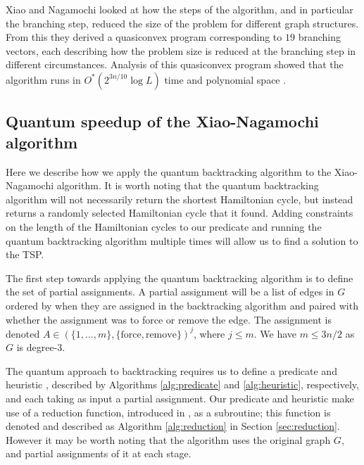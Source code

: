 Xiao and Nagamochi looked at how the steps of the algorithm, and in particular the branching step, reduced the size of the problem for different graph structures. From this they derived a quasiconvex program corresponding to $19$ branching vectors, each describing how the problem size is reduced at the branching step in different circumstances. Analysis of this quasiconvex program showed that the algorithm runs in $O^*(2^{3n/10}\log L)$ time and polynomial space \cite{xiao2016degree3}.

\subsection{Quantum speedup of the Xiao-Nagamochi algorithm}
\label{sec:deg3speedup}

Here we describe how we apply the quantum backtracking algorithm to the Xiao-Nagamochi algorithm. It is worth noting that the quantum backtracking algorithm will not necessarily return the shortest Hamiltonian cycle, but instead returns a randomly selected Hamiltonian cycle that it found. Adding constraints on the length of the Hamiltonian cycles to our predicate and running the quantum backtracking algorithm multiple times will allow us to find a solution to the TSP.

The first step towards applying the quantum backtracking algorithm is to define the set of partial assignments. A partial assignment will be a list of edges in $G$ ordered by when they are assigned in the backtracking algorithm and paired with whether the assignment was to force or remove the edge. The assignment is denoted $A \in (\{1,\dots,m\}, \{\text{force}, \text{remove}\})^j$, where $j \leq m$. We have $m \le 3n/2$ as $G$ is degree-3.


The quantum approach to backtracking requires us to define a predicate \FnPredicatethree and heuristic \FnHeuristicthree, described by Algorithms \ref{alg:predicate} and \ref{alg:heuristic}, respectively, and each taking as input a partial assignment. Our predicate and heuristic make use of a reduction function, introduced in \cite{xiao2016degree3}, as a subroutine; this function is denoted \FnReductionthree and described as Algorithm \ref{alg:reduction} in Section \ref{sec:reduction}. However it may be worth noting that the algorithm uses the original graph $G$, and partial assignments of it at each stage.

